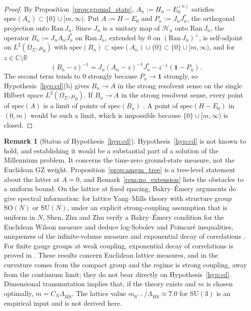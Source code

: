\documentclass[11pt,a4paper]{amsart}
\theoremstyle{definition}
\newtheorem{remark}[theorem]{Remark}
\newcommand{\R}{\mathbb{R}}
\newcommand{\C}{\mathbb{C}}
\newcommand{\cH}{\mathcal{H}}
\newcommand{\MSbar}{\overline{\mathrm{MS}}}
\begin{document}
\begin{proof}
By Proposition~\ref{prop:ground_state}, $A_n := H_n - E_0^{(n)}$ satisfies $\mathrm{spec}(A_n) \subset \{0\} \cup [m, \infty)$. Put $A := H - E_0$ and $P_n := J_n J_n^*$, the orthogonal projection onto $\mathrm{Ran}\,J_n$. Since $J_n$ is a unitary map of $\cH_n$ onto $\mathrm{Ran}\,J_n$, the operator $B_n := J_n A_n J_n^*$ on $\mathrm{Ran}\,J_n$, extended by $0$ on $(\mathrm{Ran}\,J_n)^\perp$, is self-adjoint on $L^2(\Omega_\Sigma,\mu_0)$ with $\mathrm{spec}(B_n) \subset \mathrm{spec}(A_n) \cup \{0\} \subset \{0\} \cup [m,\infty)$, and for $z \in \C\setminus\R$
\begin{equation}
    (B_n - z)^{-1} = J_n (A_n - z)^{-1} J_n^* - z^{-1}(\mathbf{1} - P_n).
\end{equation}
The second term tends to $0$ strongly because $P_n \to \mathbf{1}$ strongly, so Hypothesis~\ref{hyp:cd}(b) gives $B_n \to A$ in the strong resolvent sense on the single Hilbert space $L^2(\Omega_\Sigma,\mu_0)$. If $B_n \to A$ in the strong resolvent sense, every point of $\mathrm{spec}(A)$ is a limit of points of $\mathrm{spec}(B_n)$ \cite[Thm.~VIII.24]{reed1980methods}. A point of $\mathrm{spec}(H - E_0)$ in $(0,m)$ would be such a limit, which is impossible because $\{0\}\cup[m,\infty)$ is closed.
\end{proof}

\begin{remark}[Status of Hypothesis~\ref{hyp:cd}]
\label{rem:status_cd}
Hypothesis~\ref{hyp:cd} is not known to hold, and establishing it would be a substantial part of a solution of the Millennium problem. It concerns the time-zero ground-state measure, not the Euclidean GZ weight. Proposition~\ref{prop:amgm_tree} is a tree-level statement about the latter at $A=0$, and Remark~\ref{rem:no_extension} lists the obstacles to a uniform bound. On the lattice at fixed spacing, Bakry--\'Emery arguments do give spectral information: for lattice Yang--Mills theory with structure group $\mathrm{SO}(N)$ or $\mathrm{SU}(N)$, under an explicit strong-coupling assumption that is uniform in $N$, Shen, Zhu and Zhu verify a Bakry--\'Emery condition for the Euclidean Wilson measure and deduce log-Sobolev and Poincar\'e inequalities, uniqueness of the infinite-volume measure and exponential decay of correlations \cite{shen2023stochastic}. For finite gauge groups at weak coupling, exponential decay of correlations is proved in \cite{adhikari2025correlation}. These results concern Euclidean lattice measures, and in \cite{shen2023stochastic} the curvature comes from the compact group and the regime is strong coupling, away from the continuum limit; they do not bear directly on Hypothesis~\ref{hyp:cd}. Dimensional transmutation implies that, if the theory exists and $m$ is chosen optimally, $m = C_N\Lambda_{\MSbar}$. The lattice value $m_{0^{++}}/\Lambda_{\MSbar}\approx 7.0$ for $\mathrm{SU}(3)$ is an empirical input and is not derived here.
\end{remark}
\end{document}

